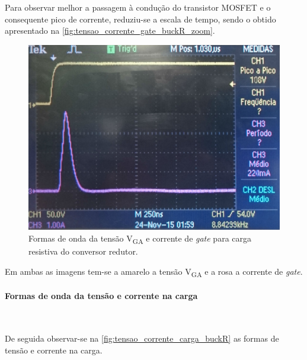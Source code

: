 \documentclass[a4paper,11pt]{article}
\numberwithin{equation}{section}
\begin{document}
Para observar melhor a passagem à condução do transistor MOSFET e o consequente pico de corrente, reduziu-se a escala de tempo, sendo o obtido apresentado na \autoref{fig:tensao_corrente_gate_buckR_zoom}.

\begin{figure}[h]
	\centering
	\includegraphics[keepaspectratio=true, scale=0.13]{img/figs/tensao_corrente_gate_buckR_zoom}
	\caption{Formas de onda da tensão V\textsubscript{GA} e corrente de \textit{gate} para carga resistiva do conversor redutor.}
	\label{fig:tensao_corrente_gate_buckR_zoom}
	\vspace{-0.8em}
\end{figure} 

Em ambas as imagens tem-se a amarelo a tensão V\textsubscript{GA} e a rosa a corrente de \textit{gate}.

\paragraph{Formas de onda da tensão e corrente na carga}\mbox{}\

De seguida observar-se na \autoref{fig:tensao_corrente_carga_buckR} as formas de tensão e corrente na carga.

\pagebreak
\end{document}

